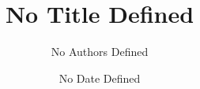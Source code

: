 \documentclass[letterpaper,10pt,titlepage]{custbook}
\begin{document}
\newcommand{\tsname}{ESRG Tool Set}

\newcommand{\tsversion}{1.06}

\newcommand{\compbooktitlelong}{A Practitioner's Guide To The Design And Development Of Small
                               Embedded Software}

\newcommand{\longthingindent}{\hspace*{14mm}}

\newcommand{\authors}{David T. Ashley}
\newcommand{\authorone}{David T. Ashley}

\title{No Title Defined}
\author{No Authors Defined}
\date{No Date Defined}


\clearpage

\raggedbottom

\frontmatter{}

\tableofcontents
\clearpage

\listoffigures
\clearpage

\listoftables





\mainmatter

\cleardoublepage{}


\cleardoublepage{}


\cleardoublepage{}


\cleardoublepage{}

\end{document}

